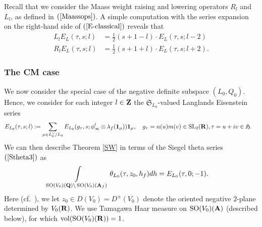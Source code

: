 \documentclass{amsart}
\theoremstyle{definition}
\theoremstyle{definition}
\theoremstyle{definition}
\begin{document}
Recall that we consider the Maass weight raising and lowering operators $R_l$ and $L_l$, as defined in $(\ref{Maassops})$.
A simple computation with the series expansion on the right-hand side of $(\ref{E-classical})$ reveals that 
\begin{equation}\begin{aligned}\label{Maassopreln} L_l E_{L}(\tau, s; l) &= \frac{1}{2}(s+1-l) \cdot E_{L}(\tau, s; l-2) \\ R_l E_{L}(\tau, s; l) &= \frac{1}{2}(s + 1 + l) \cdot E_{L}(\tau, s; l+2).\end{aligned}\end{equation} 

\subsubsection{The CM case} 

We now consider the special case of the negative definite subspace $(L_0, Q_0)$.
Hence, we consider for each integer $l \in {\bf{Z}}$ the $\mathfrak{S}_{L_0}$-valued Langlands Eisenstein series 
\begin{align}\label{E-CM} E_{L_0}(\tau, s; l) &:= \sum\limits_{ \mu \in L_0^{\vee}/L_0 } 
E_{L_0}(g_{\tau}, s; \phi_{\infty}^l \otimes \lambda_f({\bf{1}}_{\mu})) {\bf{1}}_{\mu}, 
\quad g_{\tau} = n(u)m(v) \in \operatorname{SL}_2({\bf{R}}), \tau = u + iv \in \mathfrak{H}. \end{align}
We can then describe Theorem \ref{SW} in terms of the Siegel theta series $(\ref{Stheta3})$ as 
\begin{align}\label{SW-CM} \int\limits_{  \operatorname{SO}(V_0)({\bf{Q}}) \backslash  \operatorname{SO}(V_0)({\bf{A}}_f) }
\theta_{L_0}(\tau, z_0, h_f) dh &= E_{L_0}(\tau, 0; -1). \end{align}
Here (cf.~\cite[Proposition 2.2]{BY}), we let $z_0 \in D(V_0) = D^{\pm}(V_0)$ denote the oriented negative $2$-plane determined by $V_0({\bf{R}})$. 
We use Tamagawa Haar measure on $\operatorname{SO}(V_0)({\bf{A}})$ (described below), for which $\operatorname{vol}(\operatorname{SO}(V_0)({\bf{R}}))=1$. 
\end{document}
